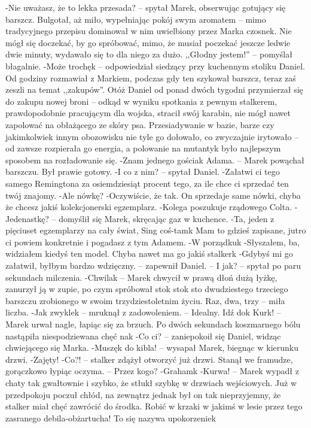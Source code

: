 \documentclass[../MAIN.tex]{subfiles}
\begin{document}
-Nie uważasz, że to lekka przesada? -- spytał Marek, obserwując gotujący się barszcz. Bulgotał, aż miło, wypełniając pokój swym aromatem -- mimo tradycyjnego przepisu dominował w nim uwielbiony przez Marka czosnek. Nie mógł się doczekać, by go spróbować, mimo, że musiał poczekać jeszcze ledwie dwie minuty, wydawało się to dla niego za dużo.
,,Głodny jestem!'' -- pomyślał błagalnie.
-Może trochę\3k -- odpowiedział siedzący przy kuchennym stoliku Daniel. Od godziny rozmawiał z Markiem, podczas gdy ten szykował barszcz, teraz zaś zeszli na temat ,,zakupów''. Otóż Daniel od ponad dwóch tygodni przymierzał się do zakupu nowej broni -- odkąd w wyniku spotkania z pewnym stalkerem, prawdopodobnie pracującym dla wojska, stracił swój karabin, nie mógł nawet zapolować na obłażącego ze skóry psa. Przesiadywanie w bazie, barze czy jakimkolwiek innym obozowisku nie tyle go dołowało, co zwyczajnie irytowało -- od zawsze rozpierała go energia, a polowanie na mutanty\3k było najlepszym sposobem na rozładowanie się.
-Znam jednego gościa\3k Adama. -- Marek powąchał barszczu. Był prawie gotowy.
-I co z nim? -- spytał Daniel.
-Załatwi ci tego samego Remingtona za osiemdziesiąt procent tego, za ile chce ci sprzedać ten twój znajomy.
-Ale nówkę?
-Oczywiście, że tak. On sprzedaje same nówki, chyba że chcesz jakiś kolekcjonerski egzemplarz.
-Kolega poszukuje rządowego Colta.
-Jedenastkę? -- domyślił się Marek, skręcając gaz w kuchence.
-Ta, jeden z pięciuset egzemplarzy na cały świat, Sing coś-tam\3k Mam to gdzieś zapisane, jutro ci powiem konkretnie i pogadasz z tym Adamem.
-W porządku\3k
-Słyszałem, ba, widziałem kiedyś ten model. Chyba nawet ma go jakiś stalker\3k
-Gdybyś mi go załatwił, byłbym bardzo wdzięczny. -- zapewnił Daniel. -- I jak? -- spytał po paru sekundach milczenia.
-Chwila\3k -- Marek chwycił w prawą dłoń dużą łyżkę, zanurzył ją w zupie, po czym spróbował sto\3k sto\3k sto dwudziestego trzeciego barszczu zrobionego w swoim trzydziestoletnim życiu. Raz, dwa, trzy -- miła liczba.
-Jak zwykle\3k -- mruknął z zadowoleniem. -- Idealny. Idź do\3k Kur\3k! -- Marek urwał nagle, łapiąc się za brzuch. Po dwóch sekundach koszmarnego bólu nastąpiła niespodziewana chęć na\3k
-Co ci? -- zaniepokoił się Daniel, widząc chwiejącego się Marka.
-Muszę\3k do kibla! -- wysapał Marek, biegnąc w kierunku drzwi.
-Zajęty!
-Co?! -- stalker zdążył otworzyć już drzwi. Stanął we framudze, gorączkowo łypiąc oczyma. -- Przez kogo?
-Graham\3k
-Kurwa! -- Marek wypadł z chaty tak gwałtownie i szybko, że stłukł szybkę w drzwiach wejściowych. Już w przedpokoju poczuł chłód, na zewnątrz jednak był on tak nieprzyjemny, że stalker miał chęć zawrócić do środka. Robić w krzaki w jakimś w lesie przez tego zasranego debila-obżartucha! To się nazywa upokorzenie\3k
\end{document}
